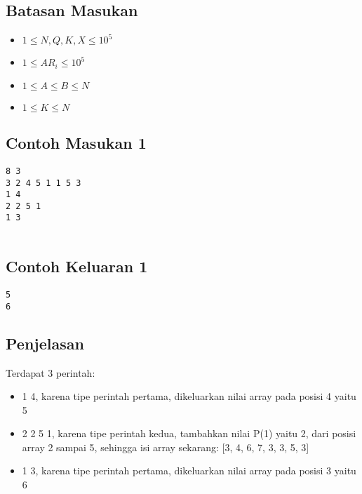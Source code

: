 \documentclass{article}
\begin{document}
\subsection*{Batasan Masukan}
\begin{itemize}
 \item $1 \leq  N, Q, K, X  \leq 10^5$
 \item $1 \leq  {AR_i}  \leq 10^5$
 \item $1 \leq  A \leq B  \leq N$
 \item $1 \leq  K \leq N$
\end{itemize}

\linebreak
\begin{multicols}{2}
\subsection*{Contoh Masukan 1}
\begin{lstlisting}
8 3
3 2 4 5 1 1 5 3
1 4 
2 2 5 1
1 3


\end{lstlisting}
\null
\columnbreak
\subsection*{Contoh Keluaran 1}
\begin{lstlisting}
5
6
\end{lstlisting}
\vfill
\null
\end{multicols}

\subsection*{Penjelasan}
Terdapat 3 perintah:
\begin{itemize}
    \item 1 4, karena tipe perintah pertama, dikeluarkan nilai array pada posisi 4 yaitu 5
    \item 2 2 5 1, karena tipe perintah kedua, tambahkan nilai P(1) yaitu 2, dari posisi array 2 sampai 5, sehingga isi array sekarang: [3, 4, 6, 7, 3, 3, 5, 3]
    \item 1 3, karena tipe perintah pertama, dikeluarkan nilai array pada posisi 3 yaitu 6
\end{itemize}
\end{document}
